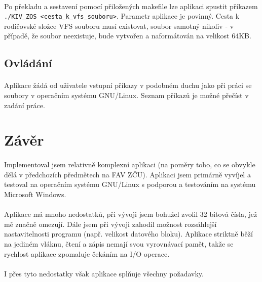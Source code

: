 \documentclass[12pt, a4paper]{article}
\begin{document}
\paragraph{}
Po překladu a sestavení pomocí přiložených makefile lze aplikaci spustit příkazem \verb|./KIV_ZOS <cesta_k_vfs_souboru>|. Parametr aplikace je povinný. Cesta k rodičovské složce VFS souboru musí existovat, soubor samotný nikoliv - v případě, že soubor neexistuje, bude vytvořen a naformátován na velikost 64KB.

\subsection{Ovládání}
\paragraph{}
Aplikace žádá od uživatele vstupní příkazy v podobném duchu jako při práci se soubory v operačním systému GNU/Linux. Seznam příkazů je možné přečíst v zadání práce. 


\newpage
\section{Závěr}
\paragraph{}
Implementoval jsem relativně komplexní aplikaci (na poměry toho, co se obvykle dělá v předchozích předmětech na FAV ZČU). Aplikaci jsem primárně vyvíjel a testoval na operačním systému GNU/Linux s podporou a testováním na systému Microsoft Windows. 
\paragraph{}
Aplikace má mnoho nedostatků, při vývoji jsem bohužel zvolil 32 bitová čísla, jež mě značně omezují. Dále jsem při vývoji zahodil možnost rozsáhlejší nastavitelnosti programu (např. velikost datového bloku). Aplikace striktně běží na jediném vláknu, čtení a zápis nemají svou vyrovnávací pamět, takže se rychlost aplikace zpomaluje čekáním na I/O operace.
\paragraph{}
I přes tyto nedostatky však aplikace splňuje všechny požadavky. 
\end{document}
